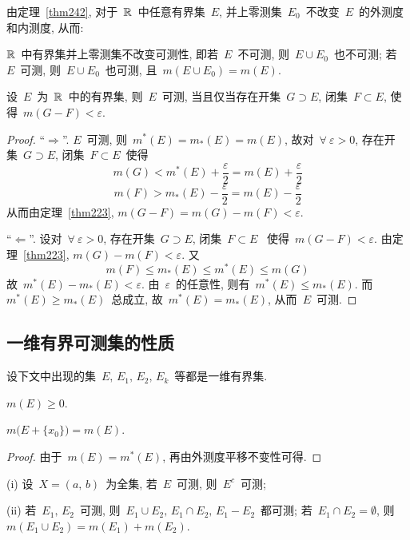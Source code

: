 由定理~\ref{thm242}, 对于~$\mathbb{R}$~中任意有界集~$E$, 并上零测集~$E_0$~不改变~$E$~的外测度和内测度, 从而:

\begin{corollary}
$\mathbb{R}$~中有界集并上零测集不改变可测性, 即若~$E$~不可测, 则~$E \cup E_0$~也不可测;
若~$E$~可测, 则~$E \cup E_0$~也可测, 且~$m(E \cup E_0) = m(E)$.
\end{corollary}

\begin{theorem} \label{thm243}
设~$E$~为~$\mathbb{R}$~中的有界集, 则~$E$~可测, 当且仅当存在开集~$G \supset E$,
闭集~$F \subset E$, 使得~$m(G-F) < \varepsilon$.
\end{theorem}

\begin{proof}
``$\Rightarrow$''. $E$~可测, 则~$m^*(E) = m_*(E) = m(E)$, 故对~$\forall~\varepsilon > 0$,
存在开集~$G \supset E$, 闭集~$F \subset E$~使得
\[
m(G) < m^*(E) + \frac{\varepsilon}{2} = m(E) + \frac{\varepsilon}{2}
\]
\[
m(F) > m_*(E) - \frac{\varepsilon}{2} = m(E) - \frac{\varepsilon}{2}
\]
从而由定理~\ref{thm223}, $m(G-F) = m(G)-m(F) < \varepsilon$.

``$\Leftarrow$''. 设对~$\forall~\varepsilon > 0$, 存在开集~$G \supset E$,
闭集~$F \subset E$~
使得~$m(G-F) < \varepsilon$. 由定理~\ref{thm223}, $m(G) - m(F) < \varepsilon$. 又
\[
m(F) \leqslant m_*(E) \leqslant m^*(E) \leqslant m(G)
\]
故~$m^*(E) - m_*(E) < \varepsilon$. 由~$\varepsilon$~的任意性,
则有~$m^*(E) \leqslant m_*(E)$. 而~$m^*(E) \geqslant m_*(E)$~总成立, 故~$m^*(E) = m_*(E)$,
从而~$E$~可测.
\end{proof}

\subsection{一维有界可测集的性质}

设下文中出现的集~$E,\,E_1,\,E_2,\,E_k$~等都是一维有界集.

\begin{proposition}[非负性]
$m(E) \geqslant 0$.
\end{proposition}

\begin{proposition}[平移不变性]
$m\big(E + \{x_0\} \big) = m(E)$.
\end{proposition}

\begin{proof}
由于~$m(E) = m^*(E)$, 再由外测度平移不变性可得.
\end{proof}

\begin{proposition}[集运算封闭性Ⅰ] \label{prop242}

(i) 设~$X = (a,\,b)$~为全集, 若~$E$~可测, 则~$E^c$~可测;

(ii) 若~$E_1,\,E_2$~可测, 则~$E_1 \cup E_2,\,E_1 \cap E_2,\,
E_1 - E_2$~都可测; 若~$E_1 \cap E_2 = \emptyset$, 则~$m(E_1 \cup E_2) = m(E_1) + m(E_2)$.
\end{proposition}

